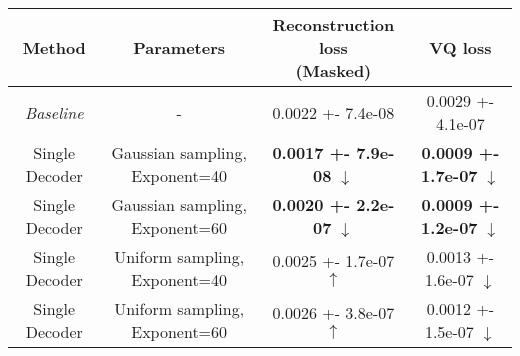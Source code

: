 \centering
\scriptsize
\begin{tabular}{||c|c|c|c||}
\hline
 Method & Parameters & \shortstack{Reconstruction loss \\  (Masked)} & VQ loss \\
\hline
\textit{Baseline} & - & 0.0022 +- 7.4e-08 & 0.0029 +- 4.1e-07 \\
\hline
Single Decoder & Gaussian sampling, Exponent=40 & \textbf{0.0017 +- 7.9e-08}  $\downarrow$ & \textbf{0.0009 +- 1.7e-07}  $\downarrow$ \\
\hline
Single Decoder & Gaussian sampling, Exponent=60 & \textbf{0.0020 +- 2.2e-07}  $\downarrow$ & \textbf{0.0009 +- 1.2e-07}  $\downarrow$ \\
\hline
Single Decoder & Uniform sampling, Exponent=40 & 0.0025 +- 1.7e-07  $\uparrow$ & 0.0013 +- 1.6e-07  $\downarrow$ \\
\hline
Single Decoder & Uniform sampling, Exponent=60 & 0.0026 +- 3.8e-07  $\uparrow$ & 0.0012 +- 1.5e-07  $\downarrow$ \\
\hline
\end{tabular}
